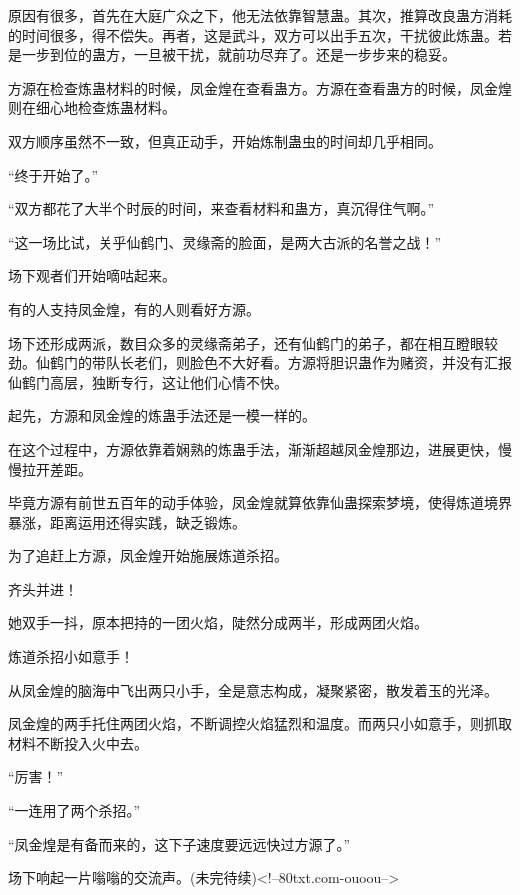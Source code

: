 \begin{this_body}
原因有很多，首先在大庭广众之下，他无法依靠智慧蛊。其次，推算改良蛊方消耗的时间很多，得不偿失。再者，这是武斗，双方可以出手五次，干扰彼此炼蛊。若是一步到位的蛊方，一旦被干扰，就前功尽弃了。还是一步步来的稳妥。

方源在检查炼蛊材料的时候，凤金煌在查看蛊方。方源在查看蛊方的时候，凤金煌则在细心地检查炼蛊材料。

双方顺序虽然不一致，但真正动手，开始炼制蛊虫的时间却几乎相同。

“终于开始了。”

“双方都花了大半个时辰的时间，来查看材料和蛊方，真沉得住气啊。”

“这一场比试，关乎仙鹤门、灵缘斋的脸面，是两大古派的名誉之战！”

场下观者们开始嘀咕起来。

有的人支持凤金煌，有的人则看好方源。

场下还形成两派，数目众多的灵缘斋弟子，还有仙鹤门的弟子，都在相互瞪眼较劲。仙鹤门的带队长老们，则脸色不大好看。方源将胆识蛊作为赌资，并没有汇报仙鹤门高层，独断专行，这让他们心情不快。

起先，方源和凤金煌的炼蛊手法还是一模一样的。

在这个过程中，方源依靠着娴熟的炼蛊手法，渐渐超越凤金煌那边，进展更快，慢慢拉开差距。

毕竟方源有前世五百年的动手体验，凤金煌就算依靠仙蛊探索梦境，使得炼道境界暴涨，距离运用还得实践，缺乏锻炼。

为了追赶上方源，凤金煌开始施展炼道杀招。

齐头并进！

她双手一抖，原本把持的一团火焰，陡然分成两半，形成两团火焰。

炼道杀招小如意手！

从凤金煌的脑海中飞出两只小手，全是意志构成，凝聚紧密，散发着玉的光泽。

凤金煌的两手托住两团火焰，不断调控火焰猛烈和温度。而两只小如意手，则抓取材料不断投入火中去。

“厉害！”

“一连用了两个杀招。”

“凤金煌是有备而来的，这下子速度要远远快过方源了。”

场下响起一片嗡嗡的交流声。(未完待续)<!--80txt.com-ouoou-->

\end{this_body}


